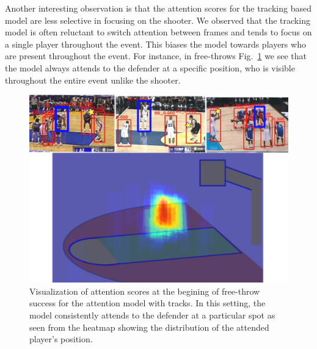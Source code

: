 Another interesting observation
is that the
attention scores for the tracking based model are less selective in focusing on
the shooter.  We observed that the tracking model is often reluctant to switch
attention between frames and tends to focus on a single player throughout the
event. This biases the model towards players who are present throughout the
event. For instance, in free-throws Fig.~\ref{fig:visual_attention_trackspec} we see that
the model always attends to the defender at a specific position, who is visible
throughout the entire event unlike the shooter.

\begin{figure}[t!]
\begin{center}
   \includegraphics[width=1.0\linewidth]{images/track_spec_output.pdf}
\end{center}
   \caption{Visualization of attention scores at the begining of free-throw success
     for the attention model with tracks. In this setting, the model consistently
     attends to the defender at a particular spot as seen from the heatmap
     showing the distribution of the attended player's position.}
\label{fig:visual_attention_trackspec}
\end{figure}





